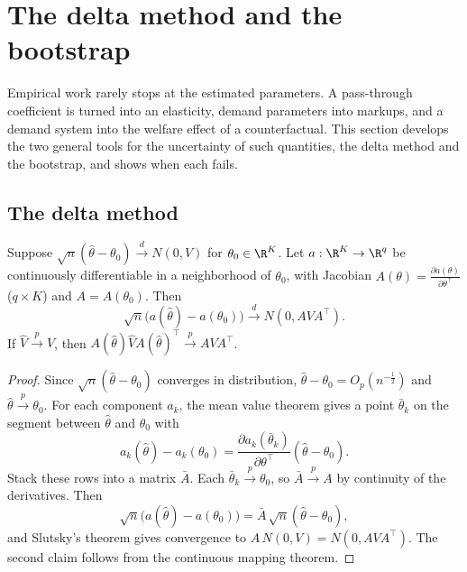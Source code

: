\section{The delta method and the bootstrap}\label{sec:A-delta-boot}

Empirical work rarely stops at the estimated parameters. A pass-through coefficient is turned into an elasticity,
demand parameters into markups, and a demand system into the welfare effect of a counterfactual. This section
develops the two general tools for the uncertainty of such quantities, the delta method and the bootstrap, and
shows when each fails.

\subsection{The delta method}\label{sec:A-delta}

\begin{theorem}\label{thm:A-delta}
Suppose $\sqrt n(\hat\theta - \theta_0) \xrightarrow{d} N(0, V)$ for $\theta_0 \in \R^K$. Let $a: \R^K \to \R^q$ be
continuously differentiable in a neighborhood of $\theta_0$, with Jacobian $A(\theta) = \frac{\partial
a(\theta)}{\partial\theta^\top}$ ($q \times K$) and $A = A(\theta_0)$. Then
\begin{equation*}
  \sqrt n\bigl(a(\hat\theta) - a(\theta_0)\bigr) \xrightarrow{d} N(0, AVA^\top).
\end{equation*}
If $\hat V \xrightarrow{p} V$, then $A(\hat\theta)\hat VA(\hat\theta)^\top \xrightarrow{p} AVA^\top$.
\end{theorem}

\begin{proof}
Since $\sqrt n(\hat\theta - \theta_0)$ converges in distribution, $\hat\theta - \theta_0 = O_p(n^{-\frac{1}{2}})$ and
$\hat\theta \xrightarrow{p} \theta_0$. For each component $a_k$, the mean value theorem gives a point $\bar\theta_k$
on the segment between $\hat\theta$ and $\theta_0$ with
\begin{equation*}
  a_k(\hat\theta) - a_k(\theta_0) = \frac{\partial a_k(\bar\theta_k)}{\partial\theta^\top}(\hat\theta - \theta_0).
\end{equation*}
Stack these rows into a matrix $\bar A$. Each $\bar\theta_k \xrightarrow{p} \theta_0$, so $\bar A \xrightarrow{p} A$
by continuity of the derivatives. Then
\begin{equation*}
  \sqrt n\bigl(a(\hat\theta) - a(\theta_0)\bigr) = \bar A\,\sqrt n(\hat\theta - \theta_0),
\end{equation*}
and Slutsky's theorem gives convergence to $A\,N(0, V) = N(0, AVA^\top)$. The second claim follows from the
continuous mapping theorem.
\end{proof}

